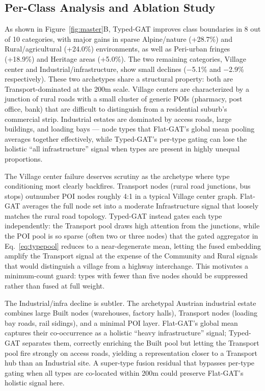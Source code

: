 \documentclass[]{interact}
\theoremstyle{plain}%
\theoremstyle{definition}
\theoremstyle{remark}
\begin{document}
\subsection{Per-Class Analysis and Ablation Study}

As shown in Figure~\ref{fig:master}B, Typed-GAT improves class boundaries in 8 out of 10 categories, with major gains in sparse Alpine/nature (+28.7\%) and Rural/agricultural (+24.0\%) environments, as well as Peri-urban fringes (+18.9\%) and Heritage areas (+5.0\%). The two remaining categories, Village center and Industrial/infrastructure, show small declines ($-$5.1\% and $-$2.9\% respectively). These two archetypes share a structural property: both are Transport-dominated at the 200m scale. Village centers are characterized by a junction of rural roads with a small cluster of generic POIs (pharmacy, post office, bank) that are difficult to distinguish from a residential suburb's commercial strip. Industrial estates are dominated by access roads, large buildings, and loading bays --- node types that Flat-GAT's global mean pooling averages together effectively, while Typed-GAT's per-type gating can lose the holistic ``all infrastructure'' signal when types are present in highly unequal proportions.

The Village center failure deserves scrutiny as the archetype where type conditioning most clearly backfires. Transport nodes (rural road junctions, bus stops) outnumber POI nodes roughly 4:1 in a typical Village center graph. Flat-GAT averages the full node set into a moderate Infrastructure signal that loosely matches the rural road topology. Typed-GAT instead gates each type independently: the Transport pool draws high attention from the junctions, while the POI pool is so sparse (often two or three nodes) that the gated aggregator in Eq.~\eqref{eq:typepool} reduces to a near-degenerate mean, letting the fused embedding amplify the Transport signal at the expense of the Community and Rural signals that would distinguish a village from a highway interchange. This motivates a minimum-count guard: types with fewer than five nodes should be suppressed rather than fused at full weight.

The Industrial/infra decline is subtler. The archetypal Austrian industrial estate combines large Built nodes (warehouses, factory halls), Transport nodes (loading bay roads, rail sidings), and a minimal POI layer. Flat-GAT's global mean captures their co-occurrence as a holistic ``heavy infrastructure'' signal; Typed-GAT separates them, correctly enriching the Built pool but letting the Transport pool fire strongly on access roads, yielding a representation closer to a Transport hub than an Industrial site. A super-type fusion residual that bypasses per-type gating when all types are co-located within 200m could preserve Flat-GAT's holistic signal here.
\end{document}
